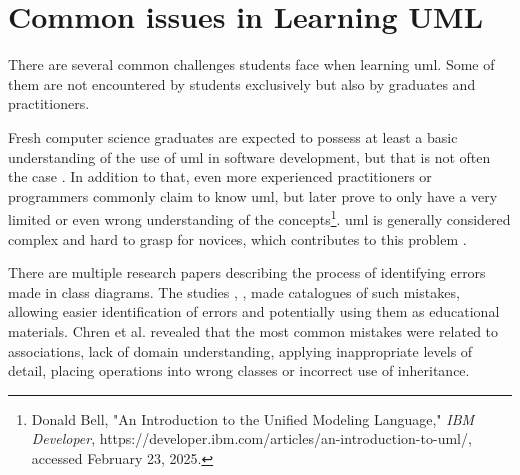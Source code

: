 \section{Common issues in Learning UML}

There are several common challenges students face when learning \ac{uml}. Some of them are not encountered by students exclusively but also by graduates and practitioners. 


Fresh computer science graduates are expected to possess at least a basic understanding of the use of \ac{uml} in software development, but that is not often the case \cite{kaur2023improving}. In addition to that, even more experienced practitioners or programmers commonly claim to know \ac{uml}, but later prove to only have a very limited or even wrong understanding of the concepts\footnote{Donald Bell, "An Introduction to the Unified Modeling Language," \textit{IBM Developer}, https://developer.ibm.com/articles/an-introduction-to-uml/, accessed February 23, 2025.}. \ac{uml} is generally considered complex and hard to grasp for novices, which contributes to this problem \cite{reuter2020insights}. 





There are multiple research papers describing the process of identifying errors made in class diagrams. The studies \cite{shmallo2020constructive}, \cite{chren2019mistakes}, \cite{reuter2020insights} made catalogues of such mistakes, allowing easier identification of errors and potentially using them as educational materials. Chren et al.\cite{chren2019mistakes} revealed that the most common mistakes were related to associations, lack of domain understanding, applying inappropriate levels of detail, placing operations into wrong classes or incorrect use of inheritance. 


